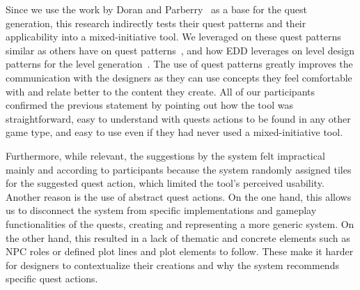 Since we use the work by Doran and Parberry~ as a base for the quest generation, this research indirectly tests their quest patterns and their applicability into a mixed-initiative tool. We leveraged on these quest patterns similar as others have on quest patterns~, and how EDD leverages on level design patterns for the level generation~. The use of quest patterns greatly improves the communication with the designers as they can use concepts they feel comfortable with and relate better to the content they create. All of our participants confirmed the previous statement by pointing out how the tool was straightforward, easy to understand with quests actions to be found in any other game type, and easy to use even if they had never used a mixed-initiative tool.


Furthermore, while relevant, the suggestions by the system felt impractical mainly and according to participants because the system randomly assigned tiles for the suggested quest action, which limited the tool's perceived usability. Another reason is the use of abstract quest actions. On the one hand, this allows us to disconnect the system from specific implementations and gameplay functionalities of the quests, creating and representing a more generic system. On the other hand, this resulted in a lack of thematic and concrete elements such as NPC roles or defined plot lines and plot elements to follow. These make it harder for designers to contextualize their creations and why the system recommends specific quest actions. %


